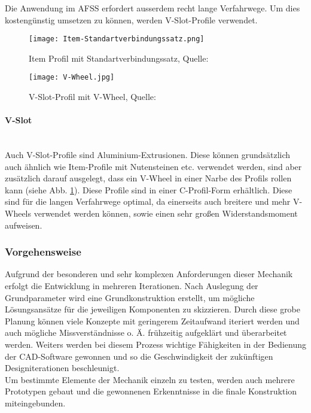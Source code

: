 Die Anwendung im AFSS erfordert ausserdem recht lange Verfahrwege. Um dies kostengünstig umsetzen zu können, werden V-Slot-Profile verwendet.

\begin{figure}[H]
    \begin{minipage}{0.5\textwidth}
        \centering
        \texttt{[image: Item-Standartverbindungssatz.png]}
        \caption{Item Profil mit Standartverbindungssatz, Quelle: \cite{Item_svs}}
        \label{sfs_item}
    \end{minipage}%
    \begin{minipage}{0.5\textwidth}
        \centering
        \texttt{[image: V-Wheel.jpg]}
        \caption{V-Slot-Profil mit V-Wheel, Quelle: \cite{v_slot_wheel}}
        \label{v-wheel}
    \end{minipage}
\end{figure}


\paragraph{V-Slot}\mbox{}\\
Auch V-Slot-Profile sind Aluminium-Extrusionen. Diese können grundsätzlich auch ähnlich wie Item-Profile mit Nutensteinen etc. verwendet werden, sind aber zusätzlich darauf ausgelegt, dass ein V-Wheel in einer Narbe des Profils rollen kann (siehe Abb. \ref{v-wheel}). Diese Profile sind in einer C-Profil-Form erhältlich. Diese sind für die langen Verfahrwege optimal, da einerseits auch breitere und mehr V-Wheels verwendet werden können, sowie einen sehr großen Widerstandsmoment aufweisen.


\subsubsection{Vorgehensweise}
Aufgrund der besonderen und sehr komplexen Anforderungen dieser Mechanik erfolgt die Entwicklung in mehreren Iterationen. Nach Auslegung der Grundparameter wird eine Grundkonstruktion erstellt, um mögliche Lösungsansätze für die jeweiligen Komponenten zu skizzieren. Durch diese grobe Planung können viele Konzepte mit geringerem Zeitaufwand iteriert werden und auch mögliche Missverständnisse o. Ä. frühzeitig aufgeklärt und überarbeitet werden. Weiters werden bei diesem Prozess wichtige Fähigkeiten in der Bedienung der CAD-Software gewonnen und so die Geschwindigkeit der zukünftigen Designiterationen beschleunigt.\\
Um bestimmte Elemente der Mechanik einzeln zu testen, werden auch mehrere Prototypen gebaut und die gewonnenen Erkenntnisse in die finale Konstruktion miteingebunden.\\

